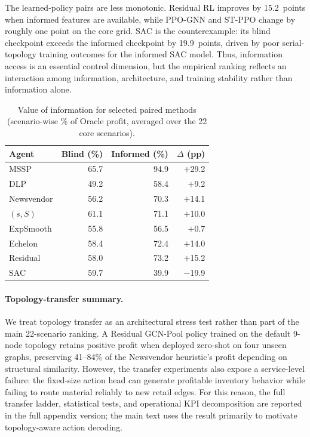 \documentclass[10pt,a4paper]{article}
\begin{document}
The learned-policy pairs are less monotonic. Residual RL improves by
15.2~points when informed features are available, while PPO-GNN and
ST-PPO change by roughly one point on the core grid. SAC is the
counterexample: its blind checkpoint exceeds the informed checkpoint by
19.9~points, driven by poor serial-topology training outcomes for the
informed SAC model. Thus, information access is an essential control
dimension, but the empirical ranking reflects an interaction among
information, architecture, and training stability rather than
information alone.

\begin{table}[!htbp]
\centering
\caption{Value of information for selected paired methods
  (scenario-wise \% of Oracle profit, averaged over the 22 core scenarios).}
\label{tab:info_value}
\small
\renewcommand{\arraystretch}{1.05}
\begin{tabular}{@{} l r r r @{}}
\toprule
\textbf{Agent}
  & \textbf{Blind (\%)}
  & \textbf{Informed (\%)}
  & \textbf{$\Delta$ (pp)} \\
\midrule
MSSP          & 65.7 & 94.9 & $+$29.2 \\
DLP           & 49.2 & 58.4 & $+$9.2 \\
Newsvendor    & 56.2 & 70.3 & $+$14.1 \\
$(s,S)$       & 61.1 & 71.1 & $+$10.0 \\
ExpSmooth     & 55.8 & 56.5 & $+$0.7 \\
Echelon       & 58.4 & 72.4 & $+$14.0 \\
Residual      & 58.0 & 73.2 & $+$15.2 \\
SAC           & 59.7 & 39.9 & $-$19.9 \\
\bottomrule
\end{tabular}
\end{table}

\paragraph{Topology-transfer summary.}
We treat topology transfer as an architectural stress test rather than
part of the main 22-scenario ranking. A Residual GCN-Pool policy trained
on the default 9-node topology retains positive profit when deployed
zero-shot on four unseen graphs, preserving 41--84\% of the Newsvendor
heuristic's profit depending on structural similarity. However, the
transfer experiments also expose a service-level failure: the
fixed-size action head can generate profitable inventory behavior while
failing to route material reliably to new retail edges. For this reason,
the full transfer ladder, statistical tests, and operational KPI
decomposition are reported in the full appendix version; the main text
uses the result primarily to motivate topology-aware action decoding.
\end{document}
